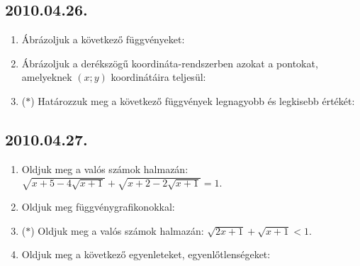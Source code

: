 \subsection*{2010.04.26.}
\begin{enumerate}
\item Ábrázoljuk a következő függvényeket:
\item Ábrázoljuk a derékszögű koordináta-rendszerben azokat a pontokat,
amelyeknek $(x;y)$ koordinátáira teljesül:
\item ($*$) Határozzuk meg a következő függvények legnagyobb és legkisebb értékét:
\end{enumerate}
\subsection*{2010.04.27.}
\begin{enumerate}
\item Oldjuk meg a valós számok halmazán: 
$\sqrt{x+5-4\sqrt{x+1}}+\sqrt{x+2-2\sqrt{x+1}}=1$.
\item Oldjuk meg függvénygrafikonokkal:
\item ($*$) Oldjuk meg a valós számok halmazán: $\sqrt{2x+1}+\sqrt{x+1}<1$.
\item Oldjuk meg a következő egyenleteket, egyenlőtlenségeket: 


\end{enumerate}

